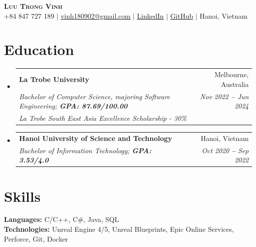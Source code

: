 \documentclass[letterpaper,11pt]{article}
\makeatletter
\newcommand{\resumeSubheading}[4]{
  \vspace{-2pt}\item
    \begin{tabular*}{0.97\textwidth}[t]{l@{\extracolsep{\fill}}r}
      \textbf{#1} & #2 \\
      \textit{\small#3} & \textit{\small #4} \\
    \end{tabular*}\vspace{-7pt}
}
\newcommand{\resumeEducationHeading}[6]{
  \vspace{-2pt}\item
    \begin{tabular*}{0.97\textwidth}[t]{l@{\extracolsep{\fill}}r}
      \textbf{#1} & #2 \\
      \textit{\small#3} & \textit{\small #4} \\
      \textit{\small#5} & \textit{\small #6} \\
    \end{tabular*}\vspace{-5pt}
}
\newcommand{\resumeSubHeadingListStart}{\begin{itemize}[leftmargin=0.15in, label={}]}
\newcommand{\resumeSubHeadingListEnd}{\end{itemize}}
\makeatother
\begin{document}

\begin{center}
	\textbf{\Huge \scshape Luu Trong Vinh} \\ \vspace{3pt}
	\small
	\faMobile \hspace{.5pt} {+84 847 727 189}
	$|$
	\faAt \hspace{.5pt} \href{mailto:vinh180902@gmail.com}{\color{blue}vinh180902@gmail.com}
	$|$
	\faLinkedinSquare \hspace{.5pt} \href{https://www.linkedin.com/in/fazeltv/}{\color{blue}LinkedIn}
	$|$
	\faGithub \hspace{.5pt} \href{https://github.com/vinhtocdo198}{\color{blue}GitHub}
	$|$
	\faMapMarker \hspace{.5pt} {Hanoi, Vietnam}
\end{center}




\section{Education}
\vspace{3pt}
\resumeSubHeadingListStart

\resumeEducationHeading
{La Trobe University}{Melbourne, Australia}
{Bachelor of Computer Science, majoring Software Engineering;   \textbf{GPA: 87.69/100.00}}{Nov 2022 \textbf{--} Jun 2024}
{La Trobe South East Asia Excellence Scholarship - 30\%}{}

\resumeSubheading
{Hanoi University of Science and Technology}{Hanoi, Vietnam}
{Bachelor of Information Technology;   \textbf{GPA: 3.53/4.0}}{Oct 2020 \textbf{--} Sep 2022}

\resumeSubHeadingListEnd




\section{Skills}
\vspace{2pt}
\resumeSubHeadingListStart
\small{\item{
	            \textbf{Languages:}{ C/C++, C\#, Java, SQL} \\ \vspace{3pt}
	            \textbf{Technologies:}{ Unreal Engine 4/5, Unreal Blueprints, Epic Online Services, Perforce, Git, Docker} \\ \vspace{3pt}
	      }}
\resumeSubHeadingListEnd
\end{document}
